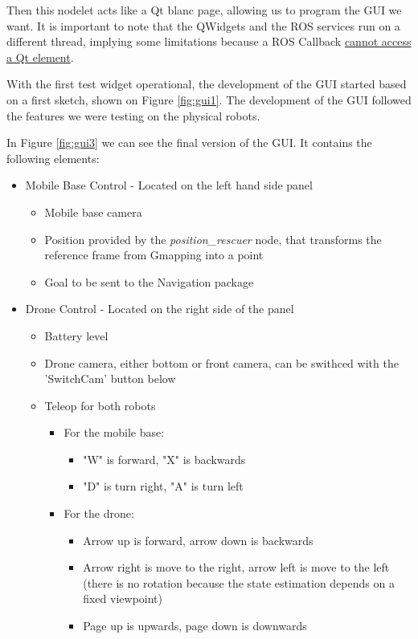 \documentclass[11pt,a4paper]{article}
\begin{document}
Then this nodelet acts like a Qt blanc page, allowing us to program the GUI we want. It is 
important to note that the QWidgets and the ROS services run on a different thread, implying some limitations because a ROS Callback
\href{http://wiki.ros.org/rqt/Tutorials/Writing\%20a\%20C\%2B\%2B\%20Plugin}
{cannot access a Qt element}.

With the first test widget operational, the development of the GUI started based on a first sketch, shown on Figure \ref{fig:gui1}. The development of the GUI followed the features we were
testing on the physical robots.

In Figure \ref{fig:gui3} we can see the final version of the GUI. It contains the following elements:

\begin{itemize}

	\item Mobile Base Control - Located on the left hand side panel
	\begin{itemize}
		\item Mobile base camera
		\item Position provided by the \textit{position\_rescuer} node, that transforms the reference frame from Gmapping into a point
		\item Goal to be sent to the Navigation package
		
	\end{itemize}
	
	\item Drone Control - Located on the right side of the panel
	\begin{itemize}
		\item Battery level
		\item Drone camera, either bottom or front camera, can be swithced with the 'SwitchCam' button below
		\item Teleop for both robots
		\begin{itemize}
			\item For the mobile base:
			\begin{itemize}
				\item "W" is forward, "X" is backwards
				\item "D" is turn right, "A" is turn left			
			\end{itemize}

			\item For the drone:
			\begin{itemize}
				\item Arrow up is forward, arrow down is backwards
				\item Arrow right is move to the right, arrow left is move to the left (there is no rotation because the state estimation depends on a fixed viewpoint)
				\item Page up is upwards, page down is downwards
			\end{itemize}	
		\end{itemize}


\end{itemize}
\end{itemize}
\end{document}
